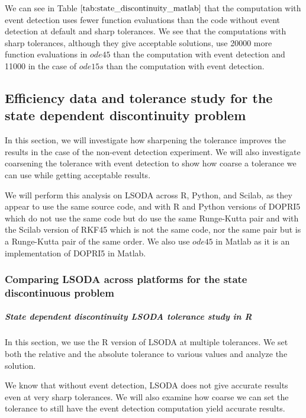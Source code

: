 We can see in Table $\ref{tab:state_discontinuity_matlab}$ that the computation with event detection uses fewer function evaluations than the code without event detection at default and sharp tolerances. We see that the computations with sharp tolerances, although they give acceptable solutions, use 20000 more function evaluations in $ode45$ than the computation with event detection and 11000 in the case of $ode15s$ than the computation with event detection.

\subsection{Efficiency data and tolerance study for the state dependent discontinuity problem}
\label{subsection:state_tolerance_study}
In this section, we will investigate how sharpening the tolerance improves the results in the case of the non-event detection experiment. We will also investigate coarsening the tolerance with event detection to show how coarse a tolerance we can use while getting acceptable results.

We will perform this analysis on LSODA across R, Python, and Scilab, as they appear to use the same source code, and with R and Python versions of DOPRI5 which do not use the same code but do use the same Runge-Kutta pair and with the Scilab version of RKF45 which is not the same code, nor the same pair but is a Runge-Kutta pair of the same order. We also use $ode45$ in Matlab as it is an implementation of DOPRI5 in Matlab. 

\subsubsection{Comparing LSODA across platforms for the state discontinuous problem}
\subparagraph{State dependent discontinuity LSODA tolerance study in R}
In this section, we use the R version of LSODA at multiple tolerances. We set both the relative and the absolute tolerance to various values and analyze the solution.

We know that without event detection, LSODA does not give accurate results even at very sharp tolerances. We will also examine how coarse we can set the tolerance to still have the event detection computation yield accurate results.

